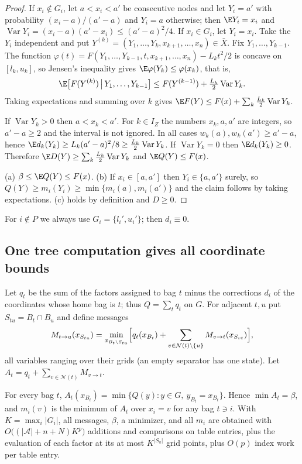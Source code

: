 \begin{proof}
If $x_i\notin G_i$, let $a<x_i<a'$ be consecutive nodes and let $Y_i=a'$ with
probability $(x_i-a)/(a'-a)$ and $Y_i=a$ otherwise; then $\E Y_i=x_i$ and
$\operatorname{Var}Y_i=(x_i-a)(a'-x_i)\le(a'-a)^2/4$. If $x_i\in G_i$, let
$Y_i=x_i$. Take the $Y_i$ independent and put
$Y^{(k)}=(Y_1,\dots,Y_k,x_{k+1},\dots,x_n)\in\bar X$.
Fix $Y_1,\dots,Y_{k-1}$. The function
$\varphi(t)=F(Y_1,\dots,Y_{k-1},t,x_{k+1},\dots,x_n)-L_kt^2/2$ is concave on
$[l_k,u_k]$, so Jensen's inequality gives $\E\varphi(Y_k)\le\varphi(x_k)$,
that is,
\[
\E\bigl[F(Y^{(k)})\,\big|\,Y_1,\dots,Y_{k-1}\bigr]
\le F(Y^{(k-1)})+\tfrac{L_k}2\operatorname{Var}Y_k .
\]
Taking expectations and summing over $k$ gives
$\E F(Y)\le F(x)+\sum_k\frac{L_k}2\operatorname{Var}Y_k$.

If $\operatorname{Var}Y_k>0$ then $a<x_k<a'$. For $k\in I_Z$ the numbers
$x_k,a,a'$ are integers, so $a'-a\ge2$ and the interval is not ignored. In all
cases $w_k(a),w_k(a')\ge a'-a$, hence
$\E d_k(Y_k)\ge L_k(a'-a)^2/8\ge\frac{L_k}2\operatorname{Var}Y_k$. If
$\operatorname{Var}Y_k=0$ then $\E d_k(Y_k)\ge0$. Therefore
$\E D(Y)\ge\sum_k\frac{L_k}2\operatorname{Var}Y_k$ and $\E Q(Y)\le F(x)$.

(a) $\beta\le\E Q(Y)\le F(x)$. (b) If $x_i\in[a,a']$ then $Y_i\in\{a,a'\}$
surely, so $Q(Y)\ge m_i(Y_i)\ge\min\{m_i(a),m_i(a')\}$ and the claim follows by
taking expectations. (c) holds by definition and $D\ge0$.
\end{proof}

For $i\notin P$ we always use $G_i=\{l_i',u_i'\}$; then $d_i\equiv0$.

\subsection{One tree computation gives all coordinate bounds}\label{core:sec:dp}

Let $q_t$ be the sum of the factors assigned to bag $t$ minus the corrections
$d_i$ of the coordinates whose home bag is $t$; thus $Q=\sum_tq_t$ on $G$. For
adjacent $t,u$ put $S_{tu}=B_t\cap B_u$ and define messages
\[
M_{t\to u}(x_{S_{tu}})=\min_{x_{B_t\setminus S_{tu}}}
\Bigl[q_t(x_{B_t})+\sum_{v\in\mathcal N(t)\setminus\{u\}}M_{v\to t}(x_{S_{vt}})\Bigr],
\]
all variables ranging over their grids (an empty separator has one state).
Let $A_t=q_t+\sum_{v\in\mathcal N(t)}M_{v\to t}$.

\begin{proposition}\label{core:prop:dp}
For every bag $t$, $A_t(x_{B_t})=\min\{Q(y):y\in G,\ y_{B_t}=x_{B_t}\}$. Hence
$\min A_t=\beta$, and $m_i(v)$ is the minimum of $A_t$ over $x_i=v$ for any bag
$t\ni i$. With $K=\max_i|G_i|$, all messages, $\beta$, a minimizer, and all
$m_i$ are obtained with $O\bigl((|\mathcal A|+n+N)K^p\bigr)$ additions and
comparisons on table entries, plus the evaluation of each factor at its at
most $K^{|S_a|}$ grid points, plus $O(p)$ index work per table entry.
\end{proposition}

